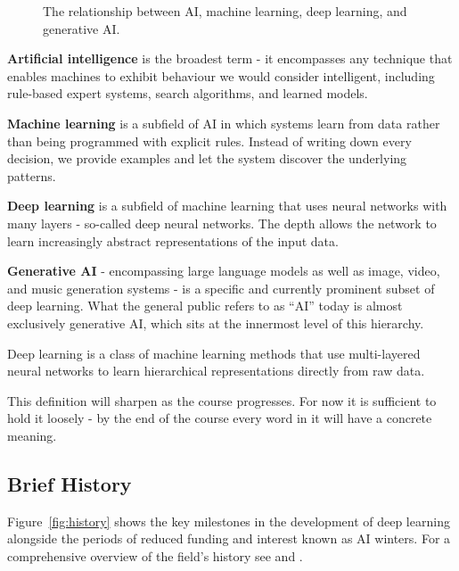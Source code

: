 \begin{figure}
    \centering
    \resizebox{0.35\textwidth}{!}{}
    \caption{The relationship between AI, machine learning, deep learning, and generative AI.}
    \label{fig:ai_ml_dl}
\end{figure}

\textbf{Artificial intelligence} is the broadest term - it encompasses any technique that enables machines to exhibit behaviour we would consider intelligent, including rule-based expert systems, search algorithms, and learned models.

\textbf{Machine learning} is a subfield of AI in which systems learn from data rather than being programmed with explicit rules. Instead of writing down every decision, we provide examples and let the system discover the underlying patterns.

\textbf{Deep learning} is a subfield of machine learning that uses neural networks with many layers - so-called deep neural networks. The depth allows the network to learn increasingly abstract representations of the input data.

\textbf{Generative AI} - encompassing large language models as well as image, video, and music generation systems - is a specific and currently prominent subset of deep learning. What the general public refers to as ``AI'' today is almost exclusively generative AI, which sits at the innermost level of this hierarchy.

\begin{definition}
Deep learning is a class of machine learning methods that use multi-layered neural networks to learn hierarchical representations directly from raw data.
\end{definition}

This definition will sharpen as the course progresses. For now it is sufficient to hold it loosely - by the end of the course every word in it will have a concrete meaning.

\subsection{Brief History}

Figure~\ref{fig:history} shows the key milestones in the development of deep learning alongside the periods of reduced funding and interest known as AI winters. For a comprehensive overview of the field's history see \cite{lecun2015deeplearning} and \cite{goodfellow2016deeplearning}.

